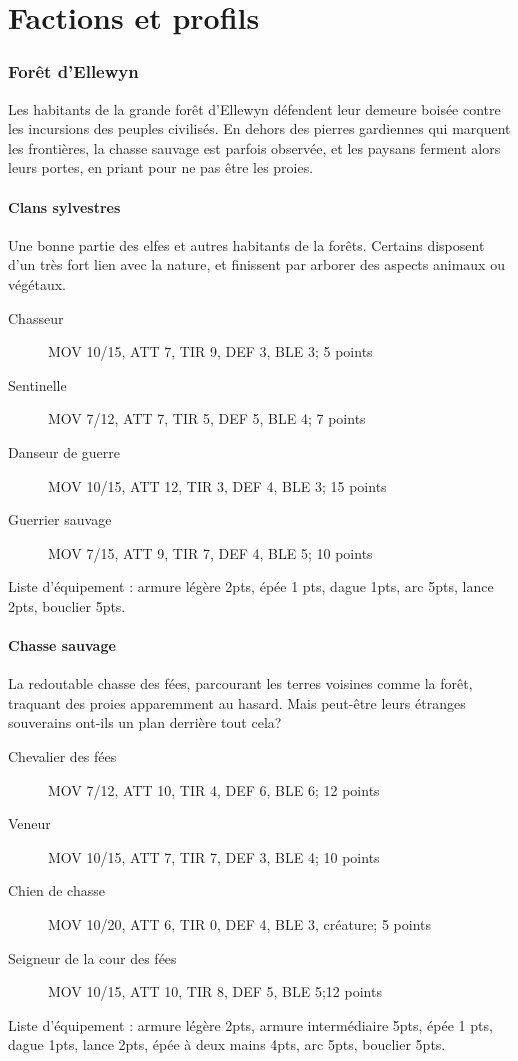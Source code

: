 \documentclass[10pt,a4paper]{article}
\begin{document}
\part{Factions et profils}
\begin{multicols}{3}
\section*{Forêt d'Ellewyn}
Les habitants de la grande forêt d'Ellewyn défendent leur demeure boisée contre les incursions des peuples civilisés. En dehors des pierres gardiennes qui marquent les frontières, la chasse sauvage est parfois observée, et les paysans ferment alors leurs portes, en priant pour ne pas être les proies.
\subsection*{Clans sylvestres}
Une bonne partie des elfes et autres habitants de la forêts. Certains disposent d'un très fort lien avec la nature, et finissent par arborer des aspects animaux ou végétaux.
\begin{description}
\item[Chasseur] MOV 10/15, ATT 7, TIR 9, DEF 3, BLE 3; 5 points
\item[Sentinelle] MOV 7/12, ATT 7, TIR 5, DEF 5, BLE 4; 7 points
\item[Danseur de guerre]MOV 10/15, ATT 12, TIR 3, DEF 4, BLE 3; 15 points
\item[Guerrier sauvage]MOV 7/15, ATT 9, TIR 7, DEF 4, BLE 5; 10 points
\end{description}
Liste d'équipement : armure légère 2pts, épée 1 pts, dague 1pts, arc 5pts, lance 2pts, bouclier 5pts.
\subsection*{Chasse sauvage}
La redoutable chasse des fées, parcourant les terres voisines comme la forêt,  traquant des proies apparemment au hasard. Mais peut-être leurs étranges souverains ont-ils un plan derrière tout cela?
\begin{description}
\item[Chevalier des fées] MOV 7/12, ATT 10, TIR 4, DEF 6, BLE 6; 12 points
\item[Veneur]MOV 10/15, ATT 7, TIR 7, DEF 3, BLE 4; 10 points
\item[Chien de chasse]MOV 10/20, ATT 6, TIR 0, DEF 4, BLE 3, créature; 5 points
\item[Seigneur de la cour des fées]MOV 10/15, ATT 10, TIR 8, DEF 5, BLE 5;12 points
\end{description} 
Liste d'équipement : armure légère 2pts, armure intermédiaire 5pts, épée 1 pts, dague 1pts, lance 2pts, épée à deux mains 4pts, arc 5pts, bouclier 5pts.

\end{multicols}
\end{document}

